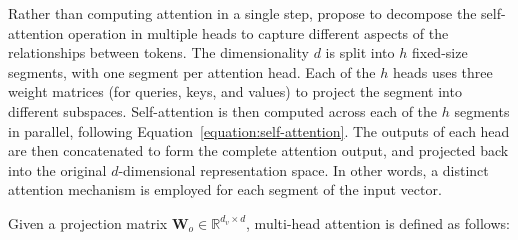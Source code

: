 Rather than computing attention in a single step, \citet{vaswani2017attention} propose to decompose the self-attention operation in multiple heads to capture different aspects of the relationships between tokens. The dimensionality $d$ is split into $h$ fixed-size segments, with one segment per attention head. Each of the $h$ heads uses three weight matrices (for queries, keys, and values) to project the segment into different subspaces. Self-attention is then computed across each of the $h$ segments in parallel, following Equation~\ref{equation:self-attention}. The outputs of each head are then concatenated to form the complete attention output, and projected back into the original $d$-dimensional representation space. In other words, a distinct attention mechanism is employed for each segment of the input vector.





Given a projection matrix $\bm{W}_o \in \mathbb{R}^{d_v \times d}$, multi-head attention is defined as follows:


